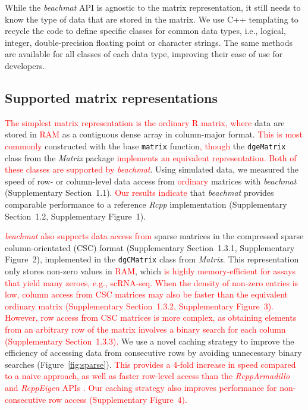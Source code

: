 \documentclass[10pt,letterpaper]{article}
\newcommand{\suppfigsimpleaccess}{1}
\newcommand{\suppfigsparseschem}{2}
\newcommand{\suppfigsparsecol}{3}
\newcommand{\suppfigsparserandom}{4}
\newcommand{\suppsecsimdesign}{1.1}
\newcommand{\suppsecsimple}{1.2}
\newcommand{\suppsecsparseschem}{1.3.1}
\newcommand{\suppsecsparsecol}{1.3.2}
\newcommand{\suppsecsparserow}{1.3.3}
\newcommand{\beachmat}{\textit{beachmat}}
\newcommand{\revised}[1]{\textcolor{red}{#1}}
\begin{document}
While the \beachmat{} API is agnostic to the matrix representation, it still needs to know the type of data that are stored in the matrix.
We use C++ templating to recycle the code to define specific classes for common data types, i.e., logical, integer, double-precision floating point or character strings.
The same methods are available for all classes of each data type, improving their ease of use for developers.

\subsection*{Supported matrix representations}
\revised{The simplest matrix representation is the ordinary R matrix, where} data are stored in \revised{RAM} as a contiguous dense array in column-major format.
\revised{This is most commonly} constructed with the base \texttt{matrix} function\revised{, though} the \texttt{dgeMatrix} class from the \textit{Matrix} package \revised{implements an equivalent representation.}
\revised{Both of these classes are supported by \beachmat{}}.
Using simulated data, we measured the speed of row- or column-level data access from \revised{ordinary} matrices with \beachmat{} (Supplementary Section~\suppsecsimdesign{}). 
\revised{Our results indicate} that \beachmat{} provides comparable performance to a reference \textit{Rcpp} implementation 
(Supplementary Section~\suppsecsimple{}, Supplementary Figure~\suppfigsimpleaccess{}). 

\revised{\beachmat{} also supports data access from} sparse matrices in the compressed sparse column-orientated (CSC) format (Supplementary Section~\suppsecsparseschem{}, Supplementary Figure~\suppfigsparseschem{}), implemented in the \texttt{dgCMatrix} class from \textit{Matrix}.
This representation only stores non-zero values in \revised{RAM}, which \revised{is highly memory-efficient for assays that yield many zeroes, e.g., scRNA-seq.
When the density of non-zero entries is low, column access from CSC matrices may also be faster than the equivalent ordinary matrix (Supplementary Section~\suppsecsparsecol{}, Supplementary Figure~\suppfigsparsecol{}).
However, row access from CSC matrices is more complex, as obtaining elements from an arbitrary row of the matrix involves a binary search for each column (Supplementary Section~\suppsecsparserow{}).}
We use a novel caching strategy to improve the efficiency of accessing data from consecutive rows by avoiding unnecessary binary searches (Figure~\ref{fig:sparse}).
\revised{This provides a 4-fold increase in speed compared to a naive approach, as well as faster row-level access than the \textit{RcppArmadillo} and \textit{RcppEigen} APIs \cite{eddelbuettel2014arma,bates2013fast}.
Our caching strategy also improves performance for non-consecutive row access (Supplementary Figure~\suppfigsparserandom{}).}
\end{document}
